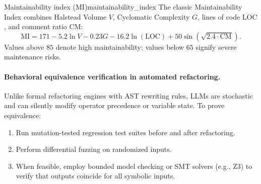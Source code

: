 \documentclass[../../main.tex]{subfiles}
\begin{document}
\begin{definition}{Maintainability index (MI)}{maintainability_index}
The classic Maintainability Index combines Halstead Volume $V$, Cyclomatic Complexity $G$, lines of code $\text{LOC}$, and comment ratio $\text{CM}$:
\begin{equation}
\text{MI} = 171 - 5.2 \ln V - 0.23 G - 16.2 \ln(\text{LOC}) + 50 \sin\left(\sqrt{2.4 \cdot \text{CM}}\right).
\end{equation}
Values above $85$ denote high maintainability; values below $65$ signify severe maintenance risks.
\end{definition}

\paragraph{Behavioral equivalence verification in automated refactoring.}
Unlike formal refactoring engines with AST rewriting rules, LLMs are stochastic and can silently modify operator precedence or variable state. To prove equivalence:
\begin{enumerate}
    \item Run mutation-tested regression test suites before and after refactoring.
    \item Perform differential fuzzing on randomized inputs.
    \item When feasible, employ bounded model checking or SMT solvers (e.g., Z3) to verify that outputs coincide for all symbolic inputs.
\end{enumerate}
\end{document}
